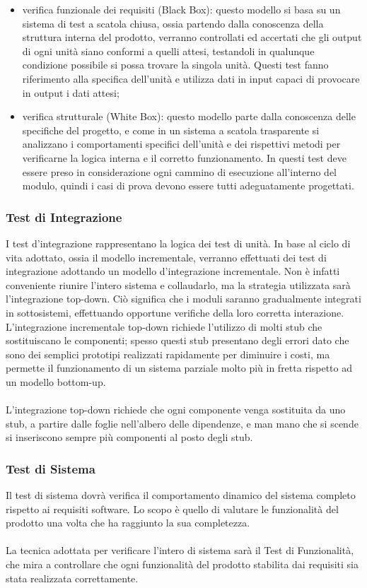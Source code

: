 \begin{itemize}
  \item verifica funzionale dei requisiti (Black Box): questo modello si basa su
  un sistema di test a scatola chiusa, ossia partendo dalla conoscenza della struttura interna del 
prodotto, verranno controllati ed accertati che gli output di ogni unit\`a siano  conformi 
a quelli attesi, testandoli in qualunque condizione possibile si possa trovare la singola 
unit\`a. Questi test fanno riferimento alla specifica dell'unit\`a e utilizza
dati in input capaci di provocare in output i dati attesi;
  \item verifica strutturale (White Box): questo modello parte dalla conoscenza 
  delle specifiche del progetto, e come in un sistema a scatola trasparente si analizzano i 
comportamenti specifici dell'unit\`a e dei rispettivi metodi per verificarne la logica 
interna e il corretto funzionamento. In questi test deve essere preso in considerazione 
ogni cammino di esecuzione all'interno del modulo, quindi i casi di prova devono essere 
tutti adeguatamente progettati. 
\end{itemize}


\subsubsection*{Test di Integrazione}
I test d'integrazione rappresentano la logica dei test di unit\`a.
In base al ciclo di vita adottato, ossia il modello incrementale, verranno effettuati dei 
test di integrazione adottando un modello d'integrazione incrementale. 
Non \`e infatti conveniente riunire l'intero sistema e collaudarlo, ma la
strategia utilizzata sar\`a l'integrazione top-down. Ci\`o significa che i
moduli saranno gradualmente integrati in sottosistemi, effettuando opportune verifiche della loro  corretta interazione. 
L'integrazione incrementale top-down richiede l'utilizzo di molti stub che
sostituiscano le componenti; spesso questi stub presentano degli errori dato che sono dei semplici 
prototipi realizzati rapidamente per diminuire i costi, ma permette il funzionamento di 
un sistema parziale molto pi\`u in fretta rispetto ad un modello bottom-up.\\
\\
L'integrazione top-down richiede che ogni componente venga sostituita da uno
stub, a partire dalle foglie nell'albero delle dipendenze, e man mano che si scende si 
inseriscono sempre pi\`u componenti al posto degli stub.

\subsubsection*{Test di Sistema} 
Il test di sistema dovr\`a verifica il comportamento
dinamico del sistema completo rispetto ai requisiti software. Lo scopo \`e
quello di valutare le funzionalit\`a del
prodotto una volta che ha raggiunto la sua completezza.
\\\\ 
La tecnica adottata per verificare l'intero di sistema sar\`a il Test di
Funzionalit\`a, che mira a controllare che ogni funzionalit\`a del
prodotto stabilita dai requisiti sia stata realizzata correttamente.


